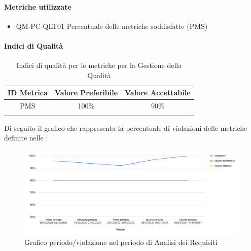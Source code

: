 		\paragraph{Metriche utilizzate}
			\begin{itemize}
				\item QM-PC-QLT01 Percentuale delle metriche soddisfatte (PMS)
			\end{itemize}
			
		\paragraph{Indici di Qualità}
			\begin{center}
				\begin{longtable}{|c|c|c|}
				\hline
				\rowcolor{lighter-grayer}
				\textbf{ID Metrica} & \textbf{Valore Preferibile} & \textbf{Valore Accettabile}\\
				\hline
				\endfirsthead
				\hline
				PMS & 100\% & 90\% \\
				\hline
				\caption{Indici di qualità per le metriche per la Gestione della Qualità}
				\end{longtable}
			\end{center}

			
			
			Di seguito il grafico che rappresenta la percentuale di violazioni delle metriche definite nelle :
			\begin{figure}[H]
				\centering
				\includegraphics[width=0.9\linewidth]{./res/images/violazioni.png}
				\caption{Grafico periodo/violazione nel periodo di Analisi dei Requisiti}
				\label{fig:Grafico violazioni periodo di Analisi dei Requisiti}
			\end{figure}


